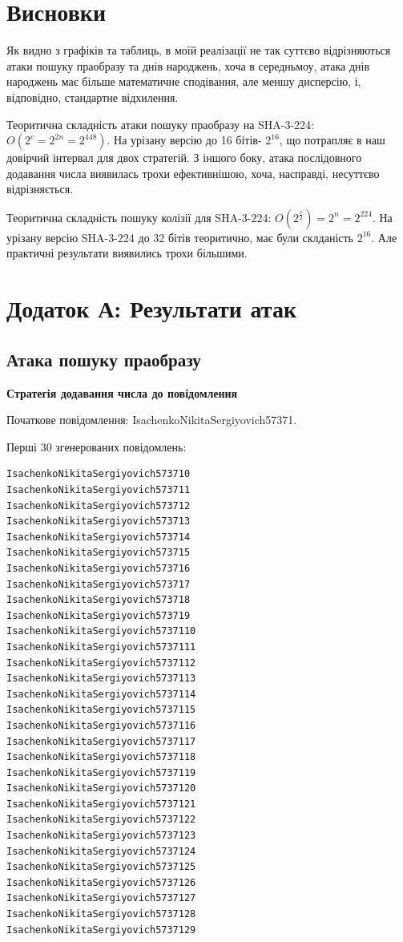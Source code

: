 \documentclass[12pt]{article}
\begin{document}
\section{Висновки}

Як видно з графіків та таблиць, в моїй реалізації не так суттєво відрізняються атаки пошуку праобразу та днів народжень, хоча в середньмоу, атака днів народжень має більше математичне сподівання, але меншу дисперсію, і, відповідно, стандартне відхилення. 

Теоритична складність атаки пошуку праобразу на SHA-3-224: $O(2^c = 2^{2n} = 2^{448})$.
На урізану версію до 16 бітів- $2^16$, що потрапляє в наш довірчий інтервал для двох стратегій. З іншого боку, атака послідовного додавання числа виявилась трохи ефективнішою, хоча, насправді, несуттєво відрізняється.

Теоритична складність пошуку колізії для SHA-3-224: $O(2^{\frac{c}{2}}) = 2^n = 2^{224}$. На урізану версію SHA-3-224 до 32 бітів теоритично, має були склданість $2^16$. Але практичні результати виявились трохи більшими.

\section{Додаток А: Результати атак}

\subsection{Атака пошуку праобразу}

\textbf{Стратегія додавання числа до повідомлення}

\noindent
Початкове повідомлення: IsachenkoNikitaSergiyovich57371.

\noindent
Перші 30 згенерованих повідомлень:
\begin{verbatim}
IsachenkoNikitaSergiyovich573710
IsachenkoNikitaSergiyovich573711
IsachenkoNikitaSergiyovich573712
IsachenkoNikitaSergiyovich573713
IsachenkoNikitaSergiyovich573714
IsachenkoNikitaSergiyovich573715
IsachenkoNikitaSergiyovich573716
IsachenkoNikitaSergiyovich573717
IsachenkoNikitaSergiyovich573718
IsachenkoNikitaSergiyovich573719
IsachenkoNikitaSergiyovich5737110
IsachenkoNikitaSergiyovich5737111
IsachenkoNikitaSergiyovich5737112
IsachenkoNikitaSergiyovich5737113
IsachenkoNikitaSergiyovich5737114
IsachenkoNikitaSergiyovich5737115
IsachenkoNikitaSergiyovich5737116
IsachenkoNikitaSergiyovich5737117
IsachenkoNikitaSergiyovich5737118
IsachenkoNikitaSergiyovich5737119
IsachenkoNikitaSergiyovich5737120
IsachenkoNikitaSergiyovich5737121
IsachenkoNikitaSergiyovich5737122
IsachenkoNikitaSergiyovich5737123
IsachenkoNikitaSergiyovich5737124
IsachenkoNikitaSergiyovich5737125
IsachenkoNikitaSergiyovich5737126
IsachenkoNikitaSergiyovich5737127
IsachenkoNikitaSergiyovich5737128
IsachenkoNikitaSergiyovich5737129    
\end{verbatim}
\end{document}
